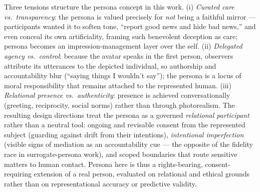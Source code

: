 Three tensions structure the persona concept in this work. (i) \emph{Curated care vs.\ transparency}: the persona is valued precisely for \emph{not} being a faithful mirror --- participants wanted it to soften tone, ``report good news and hide bad news,'' and even conceal its own artificiality, framing such benevolent deception as care; persona becomes an impression-management layer over the self. (ii) \emph{Delegated agency vs.\ control}: because the avatar speaks in the first person, observers attribute its utterances to the depicted individual, so authorship and accountability blur (``saying things I wouldn't say''); the persona is a locus of moral responsibility that remains attached to the represented human. (iii) \emph{Relational presence vs.\ authenticity}: presence is achieved conversationally (greeting, reciprocity, social norms) rather than through photorealism. The resulting design directions treat the persona as a governed \emph{relational participant} rather than a neutral tool: ongoing and revisable consent from the represented subject (guarding against drift from their intentions), \emph{intentional imperfection} (visible signs of mediation as an accountability cue --- the opposite of the fidelity race in surrogate-persona work), and scoped boundaries that route sensitive matters to human contact. Persona here is thus a rights-bearing, consent-requiring extension of a real person, evaluated on relational and ethical grounds rather than on representational accuracy or predictive validity.

